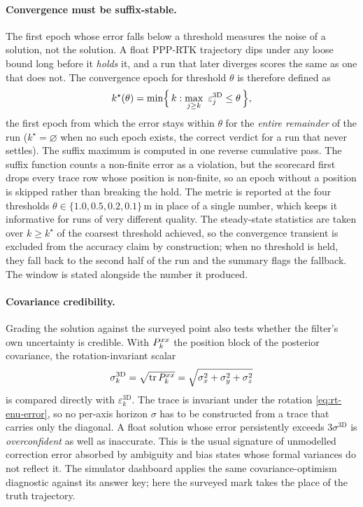 \documentclass[main.tex]{subfiles}
\begin{document}
\paragraph{Convergence must be suffix-stable.}
The first epoch whose error falls below a threshold measures the noise
of a solution, not the solution.  A float PPP-RTK trajectory dips under
any loose bound long before it \emph{holds} it, and a run that later
diverges scores the same as one that does not.  The convergence epoch
for threshold $\theta$ is therefore defined as
\begin{equation}
k^{\star}(\theta) = \min\Bigl\{\,k :
  \max_{j \ge k}\ \varepsilon^{\text{3D}}_j \le \theta \,\Bigr\},
\label{eq:rt-converge}
\end{equation}
the first epoch from which the error stays within $\theta$ for the
\emph{entire remainder} of the run ($k^\star = \varnothing$ when no such
epoch exists, the correct verdict for a run that never settles).  The
suffix maximum is computed in one reverse cumulative pass.  The suffix
function counts a non-finite error as a violation, but the scorecard
first drops every trace row whose position is non-finite, so an epoch
without a position is skipped rather than breaking the hold.  The metric
is reported at the four thresholds $\theta \in \{1.0, 0.5, 0.2, 0.1\}$\,m
in place of a single number, which keeps it informative for runs of very
different quality.  The steady-state statistics are taken over
$k \ge k^{\star}$ of the coarsest threshold achieved, so the convergence
transient is excluded from the accuracy claim by construction; when no
threshold is held, they fall back to the second half of the run and the
summary flags the fallback.  The window is stated alongside the number
it produced.

\paragraph{Covariance credibility.}
Grading the solution against the surveyed point also tests whether the
filter's own uncertainty is credible.  With $P_k^{xx}$ the position
block of the posterior covariance, the rotation-invariant scalar
\begin{equation}
\sigma^{\text{3D}}_k = \sqrt{\operatorname{tr} P_k^{xx}}
= \sqrt{\sigma_x^2 + \sigma_y^2 + \sigma_z^2}
\label{eq:rt-sigma3d}
\end{equation}
is compared directly with $\varepsilon^{\text{3D}}_k$.  The trace is
invariant under the rotation \eqref{eq:rt-enu-error}, so no per-axis
horizon $\sigma$ has to be constructed from a trace that carries only
the diagonal.  A float solution whose error persistently exceeds
$3\sigma^{\text{3D}}$ is \emph{overconfident} as well as inaccurate.
This is the usual signature of unmodelled correction error absorbed by
ambiguity and bias states whose formal variances do not reflect it.  The
simulator dashboard applies the same covariance-optimism diagnostic
against its answer key; here the surveyed mark takes the place of the
truth trajectory.
\end{document}
